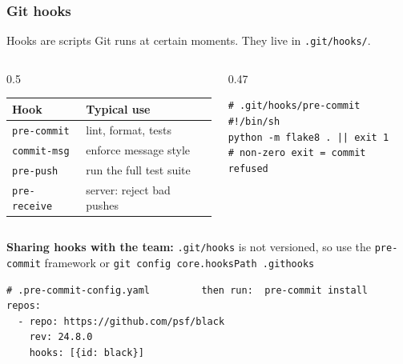 \documentclass[aspectratio=169,10pt,compress]{beamer}
\newcommand{\cmd}[1]{\texttt{\color{gitred}#1}}
\begin{document}
\begin{frame}[t,fragile] \frametitle{Git hooks}
  Hooks are scripts Git runs at certain moments. They live in \texttt{.git/hooks/}.

  \begin{columns}[T]
    \begin{column}{0.5\textwidth}
      \small
      \begin{tabular}{@{}ll@{}}
        \toprule
        \textbf{Hook} & \textbf{Typical use} \\
        \midrule
        \texttt{pre-commit} & lint, format, tests \\
        \texttt{commit-msg} & enforce message style \\
        \texttt{pre-push} & run the full test suite \\
        \texttt{pre-receive} & server: reject bad pushes \\
        \bottomrule
      \end{tabular}
    \end{column}
    \begin{column}{0.47\textwidth}
\begin{lstlisting}
# .git/hooks/pre-commit
#!/bin/sh
python -m flake8 . || exit 1
# non-zero exit = commit refused
\end{lstlisting}
    \end{column}
  \end{columns}

  \vspace{0.3em}
  \textbf{Sharing hooks with the team:} \texttt{.git/hooks} is not versioned, so use the
  \texttt{pre-commit} framework or \cmd{git config core.hooksPath .githooks}
\begin{lstlisting}[language={}]
# .pre-commit-config.yaml         then run:  pre-commit install
repos:
  - repo: https://github.com/psf/black
    rev: 24.8.0
    hooks: [{id: black}]
\end{lstlisting}
\end{frame}
\end{document}

